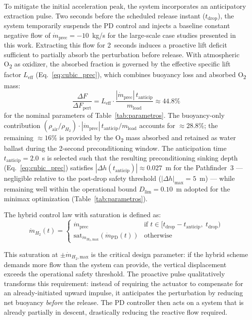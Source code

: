 \documentclass[applsci,article,submit,pdftex,moreauthors]{Definitions/mdpi}
\newcommand{\dotmmax}{\dot{m}_{H_2,\text{max}}}
\begin{document}
To mitigate the initial acceleration peak, the system incorporates an anticipatory extraction pulse. Two seconds before the scheduled release instant ($t_\text{drop}$), the system temporarily suspends the PD control and injects a baseline constant negative flow of $\dot{m}_\text{prec} = -10$~kg/s for the large-scale case studies presented in this work. Extracting this flow for 2~seconds induces a proactive lift deficit sufficient to partially absorb the perturbation before release.
With atmospheric O\textsubscript{2} as oxidizer, the absorbed fraction is governed by the effective specific lift factor $L_\text{eff}$ (Eq.~\eqref{eq:cubic_prec}), which combines buoyancy loss and absorbed O\textsubscript{2} mass:
\begin{equation}
\frac{\Delta F}{\Delta F_\text{pert}} = L_\text{eff}\cdot\frac{|\dot{m}_\text{prec}|\,t_\text{anticip}}{m_\text{load}} \approx 44.8\%
\label{eq:alpha_prec}
\end{equation}
for the nominal parameters of Table~\ref{tab:parametros}. The buoyancy-only contribution $(\rho_\text{air}/\rho_{H_2}) \cdot |\dot{m}_\text{prec}|\,t_\text{anticip}/m_\text{load}$ accounts for $\approx 28.8\%$; the remaining ${\approx}16\%$ is provided by the O\textsubscript{2} mass absorbed and retained as water ballast during the 2-second preconditioning window. The anticipation time $t_\text{anticip} = 2.0$~s is selected such that the resulting preconditioning sinking depth (Eq.~\eqref{eq:cubic_prec}) satisfies $|\Delta h(t_\text{anticip})| \approx 0.027$~m for the Pathfinder~3 --- negligible relative to the post-drop safety threshold ($|\Delta h|_\text{max} = 5$~m) --- while remaining well within the operational bound $D_\text{lim} = 0.10$~m adopted for the minimax optimization (Table~\ref{tab:parametros}).

The hybrid control law with saturation is defined as:
\begin{equation}
\dot{m}_{H_2}(t) =
\begin{cases}
\dot{m}_\text{prec} & \text{if } t \in [t_\text{drop}-t_\text{anticip},\; t_\text{drop}) \\
\text{sat}_{\dotmmax}\!\left(\dot{m}_\text{PD}(t)\right) & \text{otherwise}
\end{cases}
\end{equation}

This saturation at $\pm\dotmmax$ is the critical design parameter: if the hybrid scheme demands more flow than the system can provide, the vertical displacement exceeds the operational safety threshold. The proactive pulse qualitatively transforms this requirement: instead of requiring the actuator to compensate for an already-initiated upward impulse, it anticipates the perturbation by reducing net buoyancy \emph{before} the release. The PD controller then acts on a system that is already partially in descent, drastically reducing the reactive flow required. 
\end{document}
